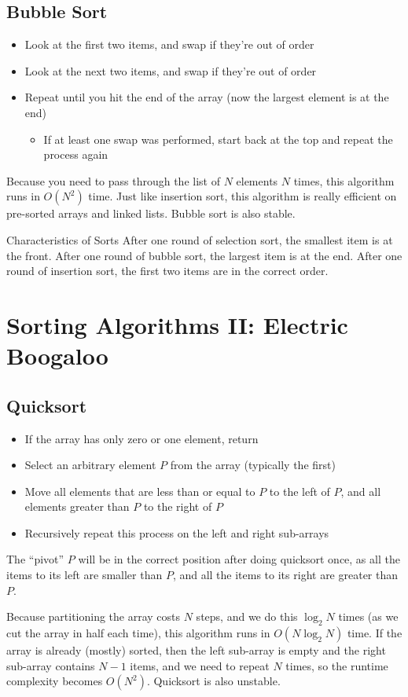 \documentclass[class=article, crop=false]{standalone}
\begin{document}
  \subsection{Bubble Sort}
  \begin{itemize}
    \item Look at the first two items, and swap if they're out of order
    \item Look at the next two items, and swap if they're out of order
    \item Repeat until you hit the end of the array (now the largest element is at the end)
    \begin{itemize}
      \item If at least one swap was performed, start back at the top and repeat the process again
    \end{itemize}
  \end{itemize}
  Because you need to pass through the list of $N$ elements $N$ times, this algorithm runs in $O(N^2)$ time. Just like insertion sort, this algorithm is really efficient on pre-sorted arrays and linked lists. Bubble sort is also stable.
  \begin{note}{Characteristics of Sorts}
    After one round of selection sort, the smallest item is at the front. After one round of bubble sort, the largest item is at the end. After one round of insertion sort, the first two items are in the correct order.
  \end{note}
  \section{Sorting Algorithms II: Electric Boogaloo}
  \subsection{Quicksort}
  \begin{itemize}
    \item If the array has only zero or one element, return
    \item Select an arbitrary element $P$ from the array (typically the first)
    \item Move all elements that are less than or equal to $P$ to the left of $P$, and all elements greater than $P$ to the right of $P$ 
    \item Recursively repeat this process on the left and right sub-arrays
  \end{itemize}
  \begin{note}{}
    The ``pivot'' $P$ will be in the correct position after doing quicksort once, as all the items to its left are smaller than $P$, and all the items to its right are greater than $P$.
  \end{note}
  Because partitioning the array costs $N$ steps, and we do this $\log_2N$ times (as we cut the array in half each time), this algorithm runs in $O(N\log_2N)$ time. If the array is already (mostly) sorted, then the left sub-array is empty and the right sub-array contains $N-1$ items, and we need to repeat $N$ times, so the runtime complexity becomes $O(N^2)$. Quicksort is also unstable.
\end{document}
